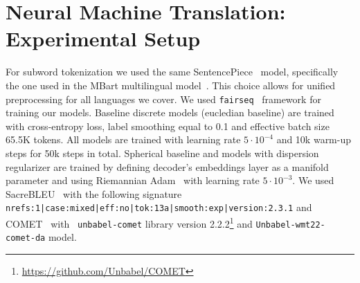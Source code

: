 \documentclass[10pt]{article} %
\begin{document}
\section{Neural Machine Translation: Experimental Setup}
\label{app:nmt-setup}
For subword tokenization we used the same SentencePiece~\citep{kudo-richardson-2018-sentencepiece} model, specifically the one used in the MBart
multilingual model~\citep{liu-etal-2020-multilingual-denoising}. This choice allows for unified preprocessing for all languages we cover. We used \texttt{fairseq}~\citep{ott2019fairseq} framework for training our models. Baseline discrete models (eucledian baseline) are trained with cross-entropy loss, label smoothing equal to 0.1 and effective batch size 65.5K tokens. All models are trained with learning rate $5\cdot10^{-4}$ and 10k warm-up steps for 50k steps in total. Spherical baseline and models with dispersion regularizer are trained by defining decoder's embeddings layer as a manifold parameter and using Riemannian Adam~\citep{becigneul2018riemannian} with learning rate $5\cdot10^{-3}$. We used SacreBLEU~\citep{post-2018-call} with the following signature \texttt{nrefs:1|case:mixed|eff:no|tok:13a|smooth:exp|version:2.3.1} and COMET~\citep{rei-etal-2020-comet} with ~\texttt{unbabel-comet} library version 2.2.2\footnote{\url{https://github.com/Unbabel/COMET}} and \texttt{Unbabel-wmt22-comet-da} model.
\end{document}
